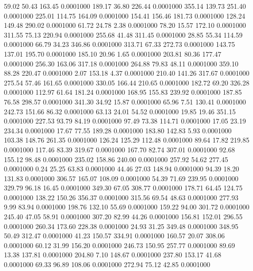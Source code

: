   59.02   50.43  163.45   0.0001000
 189.17   36.80  226.44   0.0001000
 355.14  139.73  251.40   0.0001000
 225.01  114.75  164.09   0.0001000
 154.41  156.46  181.73   0.0001000
 128.24  149.48  290.02   0.0001000
  61.72   24.78    2.38   0.0001000
  78.20   15.57  172.10   0.0001000
 311.55   75.13  220.94   0.0001000
 255.68   41.48  311.45   0.0001000
  28.85   55.34  114.59   0.0001000
  66.79   34.23  346.86   0.0001000
 313.71   67.33  272.73   0.0001000
 143.75  137.01  195.70   0.0001000
 185.10   20.96    1.65   0.0001000
 203.81   80.36  177.47   0.0001000
 256.30  163.06  317.18   0.0001000
 264.88   79.83   48.11   0.0001000
 359.10   88.28  220.47   0.0001000
   2.07  153.18    4.37   0.0001000
 210.40  141.26  317.67   0.0001000
 275.54   57.46  161.65   0.0001000
 330.05  166.44  210.65   0.0001000
 182.72   69.20  326.28   0.0001000
 112.97   61.64  181.24   0.0001000
 168.95  155.83  239.92   0.0001000
 187.85   76.58  298.57   0.0001000
 341.30   34.92   15.87   0.0001000
  65.96    7.51  130.41   0.0001000
 242.73  151.66   86.32   0.0001000
  63.13   24.01   54.52   0.0001000
  19.85   19.46  351.15   0.0001000
 227.53   93.79   84.19   0.0001000
  97.49   73.38  114.71   0.0001000
  17.05   23.19  234.34   0.0001000
  17.67   77.55  189.28   0.0001000
 183.80  142.83    5.93   0.0001000
 103.38  148.76  261.35   0.0001000
 126.24  125.29  112.48   0.0001000
  89.64   17.82  219.85   0.0001000
 117.46   83.39  319.67   0.0001000
 167.70   82.74  307.01   0.0001000
  92.68  155.12   98.48   0.0001000
 235.02  158.86  240.00   0.0001000
 257.92   54.62  277.45   0.0001000
   0.24   25.25   63.83   0.0001000
  44.46   27.03  148.94   0.0001000
  94.39   18.20  131.83   0.0001000
 306.57  165.07  108.09   0.0001000
  54.39   71.69  239.95   0.0001000
 329.79   96.18   16.45   0.0001000
 349.30   67.05  308.77   0.0001000
 178.71   64.45  124.75   0.0001000
 138.22  150.26  356.37   0.0001000
 315.56   69.54   48.63   0.0001000
 277.93    9.99   83.94   0.0001000
 198.76  132.10   55.69   0.0001000
 159.22   94.00  301.72   0.0001000
 245.40   47.05   58.91   0.0001000
 307.20   82.99   44.26   0.0001000
 156.81  152.01  296.55   0.0001000
 260.34  173.60  228.38   0.0001000
  24.93   31.25  349.48   0.0001000
 348.95   50.49  312.47   0.0001000
  41.23  150.57  334.91   0.0001000
 160.57   20.07  308.06   0.0001000
  60.12   31.99  156.20   0.0001000
 246.73  150.95  257.77   0.0001000
  89.69   13.38  137.81   0.0001000
 204.80    7.10  148.67   0.0001000
 237.80  153.17   41.68   0.0001000
  69.33   96.89  108.06   0.0001000
 272.94   75.12   42.85   0.0001000
